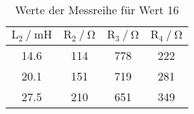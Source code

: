 \begin{table}[H]
  \centering
  \caption{Werte der Messreihe für Wert 16}
  \label{tab:tabe5}
    \begin{tabular}{c c c c}
    \toprule
    $\text{L}_2 \: / \: \si{\milli\henry} $ & $\text{R}_2 \: / \: \si{\ohm} $ &
    $\text{R}_3 \: / \: \si{\ohm} $ &
    $\text{R}_4 \: / \: \si{\ohm} $ \\
    \midrule
    14.6 & 114 & 778 & 222 \\
    20.1 & 151 & 719 & 281 \\
    27.5 & 210 & 651 & 349 \\
    \bottomrule
    \end{tabular}
\end{table}
